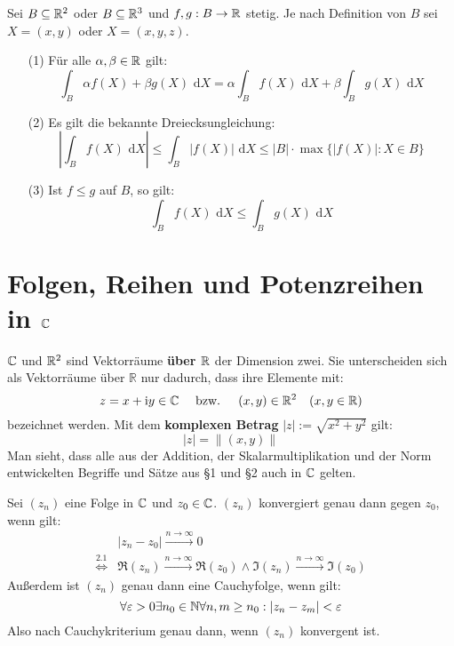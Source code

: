 \documentclass[a4paper,oneside,DIV15,BCOR12mm,chapterprefix=true,headings=onelinechapter]{scrbook}
\begin{document}
\begin{enumerate}
\begin{satz}
Sei $B\subseteq\mathbb{R}^2$ oder $B\subseteq\mathbb{R}^3$ und $f,g:B\to\mathbb{R}$ stetig.
Je nach Definition von $B$ sei $X=(x,y)$ oder $X=(x,y,z)$.
\begin{enumerate}
\item[(1)] Für alle $\alpha,\beta\in\mathbb{R}$ gilt:
\[\int_B \alpha f(X)+\beta g(X)\text{ d}X=\alpha\int_B f(X)\text{ d}X+\beta\int_B g(X)\text{ d}X\]
\item[(2)] Es gilt die bekannte Dreiecksungleichung:
\[\left|\int_B f(X)\text{ d}X\right|\le \int_B |f(X)| \text{ d}X\le |B|\cdot \max\{|f(X)|: X\in B\}\]
\item[(3)] Ist $f\le g$ auf $B$, so gilt:
\[\int_B f(X)\text{ d}X \le \int_B g(X)\text{ d}X\]
\end{enumerate}
\end{satz}
\end{enumerate}

\chapter{Folgen, Reihen und Potenzreihen in $\mathbb{C}$}
\renewcommand{\labelenumi}{(\arabic{enumi})}

$\mathbb{C}$ und $\mathbb{R}^2$ sind Vektorräume \textbf{über $\mathbb{R}$} der Dimension zwei.
Sie unterscheiden sich als Vektorräume über $\mathbb{R}$ nur dadurch, dass ihre Elemente
mit:
\[z=x+\text{i} y\in \mathbb{C} \quad \text { bzw. }\quad (x,y)\in\mathbb{R}^2 \quad(x,y\in\mathbb{R})\]
bezeichnet werden. Mit dem \textbf{komplexen Betrag} $|z|:=\sqrt{x^2+y^2}$ gilt:
\[|z|=\|(x,y)\|\]
Man sieht, dass alle aus der Addition, der Skalarmultiplikation und der Norm entwickelten Begriffe
und Sätze aus §1 und §2 auch in $\mathbb{C}$ gelten.\\

\begin{beispiel}
Sei $(z_n)$ eine Folge in $\mathbb{C}$ und $z_0\in\mathbb{C}$. $(z_n)$ konvergiert genau dann gegen
$z_0$, wenn gilt:
\begin{align*}
&|z_n-z_0|\stackrel{n\to\infty}{\to}0\\
\stackrel{2.1}{\iff} &\Re(z_n)\stackrel{n\to\infty}{\to}\Re(z_0)\wedge
\Im(z_n)\stackrel{n\to\infty}{\to}\Im(z_0)
\end{align*}
Außerdem ist $(z_n)$ genau dann eine Cauchyfolge, wenn gilt:
\[\forall\varepsilon>0\exists n_0\in\mathbb{N}\forall n,m\ge n_0: |z_n-z_m|<\varepsilon\]
Also nach Cauchykriterium genau dann, wenn $(z_n)$ konvergent ist.
\end{beispiel}
\end{document}
